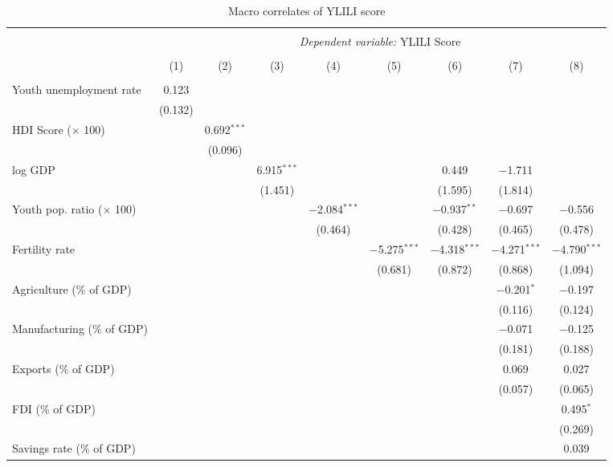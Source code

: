 \documentclass[
  a4paper, twoside, 12pt]{book}
\begin{document}
\begin{singlespace}

\begin{table}[H] \centering 
  \caption{Macro correlates of YLILI score} 
  \label{tab:tbl-macrocorr} 
\scriptsize 
\begin{tabular}{@{\extracolsep{-5pt}}lcccccccc} 
\\[-1.8ex]\hline 
\hline \\[-1.8ex] 
 & \multicolumn{8}{c}{\textit{Dependent variable:} YLILI Score} \\ 
\cline{2-9} 
\\[-1.8ex] & (1) & (2) & (3) & (4) & (5) & (6) & (7) & (8)\\ 
\hline \\[-1.8ex] 
 Youth unemployment rate & 0.123 &  &  &  &  &  &  &  \\ 
  & (0.132) &  &  &  &  &  &  &  \\ 
  HDI Score ($\times$ 100) &  & 0.692$^{***}$ &  &  &  &  &  &  \\ 
  &  & (0.096) &  &  &  &  &  &  \\ 
  log GDP &  &  & 6.915$^{***}$ &  &  & 0.449 & $-$1.711 &  \\ 
  &  &  & (1.451) &  &  & (1.595) & (1.814) &  \\ 
  Youth pop. ratio ($\times$ 100) &  &  &  & $-$2.084$^{***}$ &  & $-$0.937$^{**}$ & $-$0.697 & $-$0.556 \\ 
  &  &  &  & (0.464) &  & (0.428) & (0.465) & (0.478) \\ 
  Fertility rate &  &  &  &  & $-$5.275$^{***}$ & $-$4.318$^{***}$ & $-$4.271$^{***}$ & $-$4.790$^{***}$ \\ 
  &  &  &  &  & (0.681) & (0.872) & (0.868) & (1.094) \\ 
  Agriculture (\% of GDP) &  &  &  &  &  &  & $-$0.201$^{*}$ & $-$0.197 \\ 
  &  &  &  &  &  &  & (0.116) & (0.124) \\ 
  Manufacturing (\% of GDP) &  &  &  &  &  &  & $-$0.071 & $-$0.125 \\ 
  &  &  &  &  &  &  & (0.181) & (0.188) \\ 
  Exports (\% of GDP) &  &  &  &  &  &  & 0.069 & 0.027 \\ 
  &  &  &  &  &  &  & (0.057) & (0.065) \\ 
  FDI (\% of GDP) &  &  &  &  &  &  &  & 0.495$^{*}$ \\ 
  &  &  &  &  &  &  &  & (0.269) \\ 
  Savings rate (\% of GDP) &  &  &  &  &  &  &  & 0.039 \\ 

\end{tabular}
\end{table}
\end{singlespace}
\end{document}

